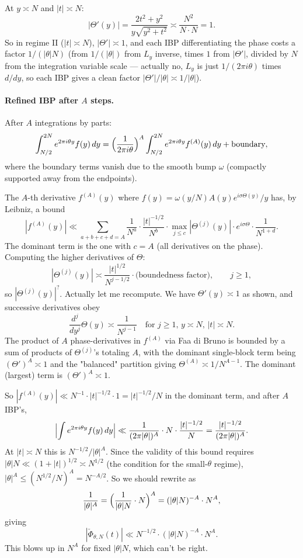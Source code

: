 \documentclass[11pt]{article}
\theoremstyle{definition}
\begin{document}
At $y \asymp N$ and $|t| \asymp N$:
\[
   |\Theta'(y)| = \frac{2t^2+y^2}{y\sqrt{y^2+t^2}} \asymp \frac{N^2}{N\cdot N} = 1.
\]
So in regime II ($|t| \asymp N$), $|\Theta'| \asymp 1$, and each IBP differentiating the phase costs a factor $1/(|\theta|N)$ (from $1/(|\theta|)$ from $L_y$ inverse, times $1$ from $|\Theta'|$, divided by $N$ from the integration variable scale — actually no, $L_y$ is just $1/(2\pi i\theta)$ times $d/dy$, so each IBP gives a clean factor $|\Theta'|/|\theta| \asymp 1/|\theta|$).

\paragraph{Refined IBP after $A$ steps.}
After $A$ integrations by parts:
\[
    \int_{N/2}^{2N} e^{2\pi i\theta y} f(y)\,dy = \Bigl(\frac{1}{2\pi i\theta}\Bigr)^A\int_{N/2}^{2N}e^{2\pi i\theta y}f^{(A)}(y)\,dy + \text{boundary},
\]
where the boundary terms vanish due to the smooth bump $\omega$ (compactly supported away from the endpoints).

The $A$-th derivative $f^{(A)}(y)$ where $f(y) = \omega(y/N)A(y)e^{i\sigma\Theta(y)}/y$ has, by Leibniz, a bound
\[
   |f^{(A)}(y)| \ll \sum_{a+b+c+d = A} \frac{1}{N^a}\cdot\frac{|t|^{-1/2}}{N^b}\cdot \max_{j \le c}|\Theta^{(j)}(y)|\cdot e^{i\sigma\Theta}\cdot \frac{1}{N^{1+d}}.
\]
The dominant term is the one with $c = A$ (all derivatives on the phase). Computing the higher derivatives of $\Theta$:
\[
   |\Theta^{(j)}(y)| \asymp \frac{|t|^{1/2}}{N^{j-1/2}}\cdot \text{(boundedness factor)}, \qquad j \ge 1,
\]
so $|\Theta^{(j)}(y)|^{?}$. Actually let me recompute. We have $\Theta'(y) \asymp 1$ as shown, and successive derivatives obey
\[
    \frac{d^j}{dy^j}\Theta(y) \asymp \frac{1}{N^{j-1}}\quad\text{for $j \ge 1$, $y \asymp N$, $|t| \asymp N$}.
\]
The product of $A$ phase-derivatives in $f^{(A)}$ via Faa di Bruno is bounded by a sum of products of $\Theta^{(j)}$'s totaling $A$, with the dominant single-block term being $(\Theta')^A \asymp 1$ and the "balanced" partition giving $\Theta^{(A)} \asymp 1/N^{A-1}$. The dominant (largest) term is $(\Theta')^A \asymp 1$.

So $|f^{(A)}(y)| \ll N^{-1}\cdot|t|^{-1/2}\cdot 1 = |t|^{-1/2}/N$ in the dominant term, and after $A$ IBP's,
\[
   \Bigl|\int e^{2\pi i\theta y}f(y)\,dy\Bigr| \ll \frac{1}{(2\pi|\theta|)^A}\cdot N\cdot \frac{|t|^{-1/2}}{N} = \frac{|t|^{-1/2}}{(2\pi|\theta|)^A}.
\]
At $|t| \asymp N$ this is $N^{-1/2}/|\theta|^A$. Since the validity of this bound requires $|\theta|N \ll (1+|t|)^{1/2} \asymp N^{1/2}$ (the condition for the small-$\theta$ regime), $|\theta|^A \le (N^{1/2}/N)^A = N^{-A/2}$. So we should rewrite as
\[
    \frac{1}{|\theta|^A} = \Bigl(\frac{1}{|\theta|N}\cdot N\Bigr)^A = (|\theta|N)^{-A}\cdot N^A,
\]
giving
\[
   |\check\Phi_{\theta,N}(t)| \ll N^{-1/2}\cdot(|\theta|N)^{-A}\cdot N^A.
\]
This blows up in $N^A$ for fixed $|\theta|N$, which can't be right.
\end{document}
